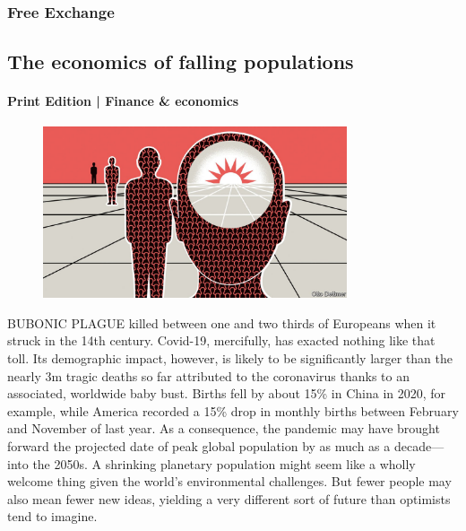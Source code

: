 \documentclass{article}
\begin{document}
\subsubsection{Free Exchange }
\subsection{The economics of falling populations }
\paragraph{Print Edition | Finance \& economics  \quad \color{gray}{Mar 27th 2021 }}
\begin{figure}[h]
\centering
\includegraphics[width=0.8\textwidth]{images/20210327_fnd000.jpg}
\end{figure}
\lettrine{B}UBONIC PLAGUE killed between one and two thirds of Europeans when it struck in the 14th century. Covid-19, mercifully, has exacted nothing like that toll. Its demographic impact, however, is likely to be significantly larger than the nearly 3m tragic deaths so far attributed to the coronavirus thanks to an associated, worldwide baby bust. Births fell by about 15\% in China in 2020, for example, while America recorded a 15\% drop in monthly births between February and November of last year. As a consequence, the pandemic may have brought forward the projected date of peak global population by as much as a decade---into the 2050s. A shrinking planetary population might seem like a wholly welcome thing given the world's environmental challenges. But fewer people may also mean fewer new ideas, yielding a very different sort of future than optimists tend to imagine. 
\end{document}
